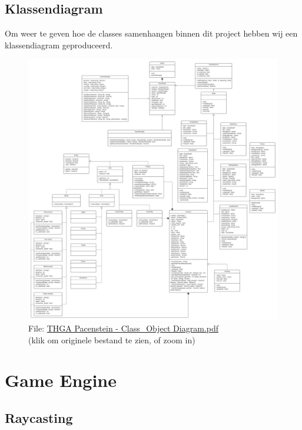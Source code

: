 \documentclass{report}
\begin{document}
\section{Klassendiagram} %
\label{sec:klassendiagram}
Om weer te geven hoe de classes samenhangen binnen dit project hebben wij een klassendiagram geproduceerd.
\begin{figure}[h]
  \centering
  \includegraphics[width=.73\textwidth]{THGA Pacenstein - Class_Object Diagram.pdf}
  \caption{File: \url{THGA Pacenstein - Class_Object Diagram.pdf}\\(klik om originele bestand te zien, of zoom in)}
\end{figure}

\chapter{Game Engine} %
\label{cha:game_engine}

  \section{Raycasting} %
  \label{sec:raycasting}
\end{document}
